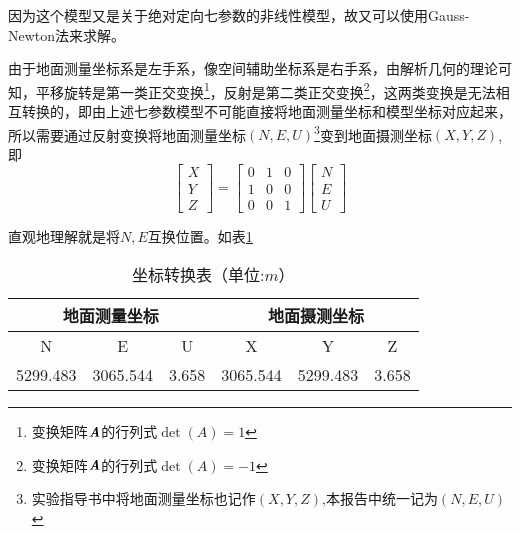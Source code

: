 因为这个模型又是关于绝对定向七参数的非线性模型，故又可以使用Gauss-Newton法来求解。

由于地面测量坐标系是左手系，像空间辅助坐标系是右手系，由解析几何的理论可知，平移旋转是第一类正交变换\footnote{变换矩阵$\boldsymbol{\mathit{A}}$的行列式$\det(A)=1$}，反射是第二类正交变换\footnote{变换矩阵$\boldsymbol{\mathit{A}}$的行列式$\det(A)=-1$}，这两类变换是无法相互转换的，即由上述七参数模型不可能直接将地面测量坐标和模型坐标对应起来，所以需要通过反射变换将地面测量坐标$(N,E,U)$\footnote{实验指导书中将地面测量坐标也记作$(X,Y,Z)$,本报告中统一记为$(N,E,U)$}变到地面摄测坐标$(X,Y,Z)$,即
\begin{equation}
\begin{bmatrix}
X \\  Y \\ Z
\end{bmatrix}=
\begin{bmatrix}
0 & 1 & 0 \\
1 & 0 & 0 \\
0 & 0 & 1
\end{bmatrix}
\begin{bmatrix}
N \\ E \\ U
\end{bmatrix}
\end{equation}

直观地理解就是将$N,E$互换位置。如表\ref{tab:coor}
\begin{table}[htbp]
\centering
\caption{坐标转换表（单位:$\si{m}$）}
\label{tab:coor}
\begin{tabular}{|c|c|c|c|c|c|}
\hline
\multicolumn{3}{|c|}{地面测量坐标} & \multicolumn{3}{c|}{地面摄测坐标} \\ \hline
      N  &   E    &   U   &   X    &   Y    &   Z   \\ \hline
   5299.483     &   3065.544    &   3.658   &  3065.544     &  5299.483     & 3.658   \\
\hline
\end{tabular}
\end{table}

